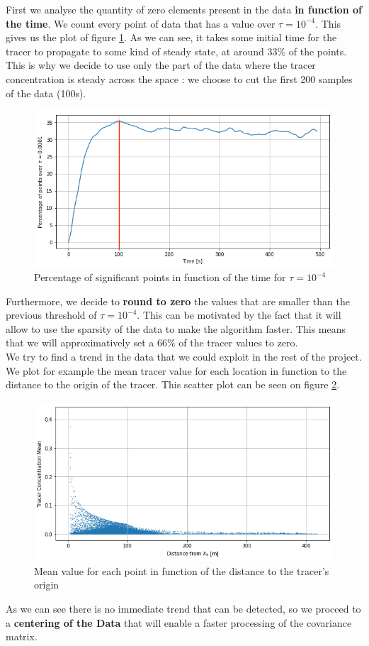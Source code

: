 First we analyse the quantity of zero elements present in the data \textbf{in function of the time}. We count every point of data that has a value over $\tau = 10^{-4}$. This gives us the plot of figure \ref{fig:sumtime}. As we can see, it takes some initial time for the tracer to propagate to some kind of steady state, at around 33\% of the points. This is why we decide to use only the part of the data where the tracer concentration is steady across the space : we choose to cut the first 200 samples of the data (100s). \\

\begin{figure}[]
\centering
	\includegraphics[width = 0.7 \textwidth]{figures/DataAnalysis/SumDataTime}
	\caption{Percentage of significant points in function of the time for $\tau = 10^{-4}$}
	\label{fig:sumtime}
\end{figure}


Furthermore, we decide to \textbf{round to zero} the values that are smaller than the previous threshold of $\tau = 10^{-4}$. This can be motivated by the fact that it will allow to use the sparsity of the data to make the algorithm faster. This means that we will approximatively set a 66\% of the tracer values to zero.\\

We try to find a trend in the data that we could exploit in the rest of the project. We plot for example the mean tracer value for each location in function to the distance to the origin of the tracer. This scatter plot can be seen on figure \ref{fig:tracerdistance}. 

\begin{figure}[]
\centering
	\includegraphics[width = 0.7 \textwidth]{figures/DataAnalysis/TracerMeanDistance}
	\caption{Mean value for each point in function of the distance to the tracer's origin}
	\label{fig:tracerdistance}
\end{figure}


As we can see there is no immediate trend that can be detected, so we proceed to a \textbf{centering of the Data} that will enable a faster processing of the covariance matrix. 












